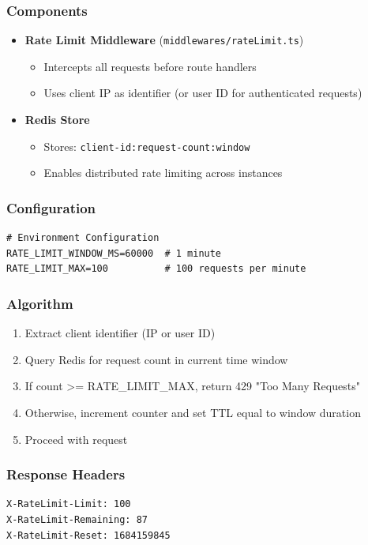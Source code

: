 \documentclass[12pt,oneside,a4paper]{article}
\begin{document}
\subsubsection{Components}
\begin{itemize}
    \item \textbf{Rate Limit Middleware} (\texttt{middlewares/rateLimit.ts})
        \begin{itemize}
            \item Intercepts all requests before route handlers
            \item Uses client IP as identifier (or user ID for authenticated requests)
        \end{itemize}
    \item \textbf{Redis Store}
        \begin{itemize}
            \item Stores: \texttt{client-id:request-count:window}
            \item Enables distributed rate limiting across instances
        \end{itemize}
\end{itemize}

\subsubsection{Configuration}
\begin{lstlisting}
# Environment Configuration
RATE_LIMIT_WINDOW_MS=60000  # 1 minute
RATE_LIMIT_MAX=100          # 100 requests per minute
\end{lstlisting}

\subsubsection{Algorithm}
\begin{enumerate}
    \item Extract client identifier (IP or user ID)
    \item Query Redis for request count in current time window
    \item If count >= RATE_LIMIT_MAX, return 429 "Too Many Requests"
    \item Otherwise, increment counter and set TTL equal to window duration
    \item Proceed with request
\end{enumerate}

\subsubsection{Response Headers}
\begin{lstlisting}
X-RateLimit-Limit: 100
X-RateLimit-Remaining: 87
X-RateLimit-Reset: 1684159845
\end{lstlisting}
\end{document}
